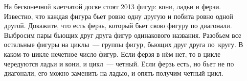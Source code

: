 \problem
На бесконечной клетчатой доске стоят 2013 фигур: кони, ладьи и ферзи.
Известно, что каждая фигура бьет ровно одну другую и побита ровно одной другой.
Докажите, что есть ферзь, который бьет свою фигуру по диагонали.
\solution
Выбросим пары бьющих друг друга фигур одинакового названия.
Разобьем все остальные фигуры на циклы~--- группы фигур, бьющих друг друга
по~кругу.
В каком-то цикле нечетное число фигур.
Если ферзя в нём нет, то в цикле чередуются ладьи и кони, и цикл~--- четный.
Если ферзь есть, но бьет не по диагонали, его можно заменить на ладью, и опять
получим четный цикл. 
\endproblem
